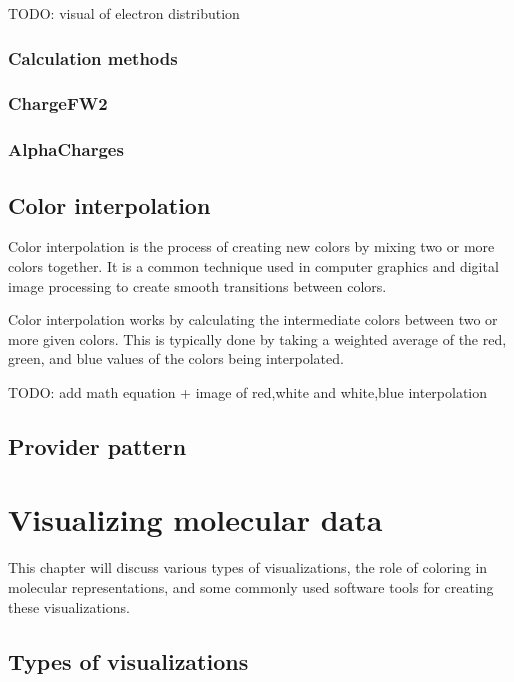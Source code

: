 \documentclass[
  digital,     %
  oneside,     %
  nosansbold,  %
  nocolorbold, %
  lof,         %
  lot,         %
]{fithesis4}
\begin{document}
TODO: visual of electron distribution

\subsection{Calculation methods}
\label{subsection:calculation_methods}

\subsection{ChargeFW2}
\label{subsection:chargfw2}
\parencite{10.1093/nar/gkaa367}

\subsection{AlphaCharges}
\label{subsection:alphacharges}

\section{Color interpolation}
\label{section:color_interpolation}

Color interpolation is the process of creating new colors by mixing two or more colors together. It is a common technique used in computer graphics and digital image processing to create smooth transitions between colors.

Color interpolation works by calculating the intermediate colors between two or more given colors. This is typically done by taking a weighted average of the red, green, and blue values of the colors being interpolated.

TODO: add math equation + image of red,white and white,blue interpolation

\section{Provider pattern}
\label{section:provider_pattern}

\chapter{Visualizing molecular data}
\label{chapter:visualizing_molecular_data}

This chapter will discuss various types of visualizations, the role of coloring in molecular representations, and some commonly used software tools for creating these visualizations.

\section{Types of visualizations}
\label{section:types_of_visualizations}
\end{document}
